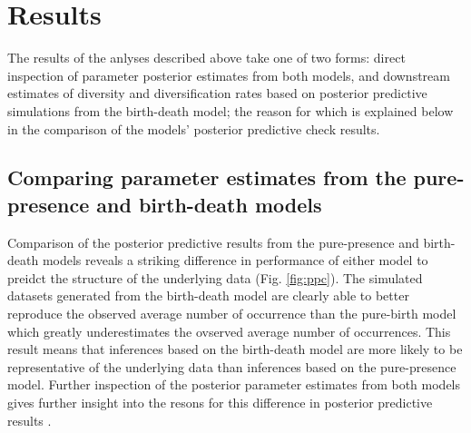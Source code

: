 \documentclass[12pt,letterpaper]{article}
\begin{document}
\section*{Results}

The results of the anlyses described above take one of two forms: direct inspection of parameter posterior estimates from both models, and downstream estimates of diversity and diversification rates based on posterior predictive simulations from the birth-death model; the reason for which is explained below in the comparison of the models' posterior predictive check results.

\subsection*{Comparing parameter estimates from the pure-presence and birth-death models}


Comparison of the posterior predictive results from the pure-presence and birth-death models reveals a striking difference in performance of either model to preidct the structure of the underlying data (Fig. \ref{fig:ppc}). The simulated datasets generated from the birth-death model are clearly able to better reproduce the observed average number of occurrence than the pure-birth model which greatly underestimates the ovserved average number of occurrences. This result means that inferences based on the birth-death model are more likely to be representative of the underlying data than inferences based on the pure-presence model. Further inspection of the posterior parameter estimates from both models gives further insight into the resons for this difference in posterior predictive results \citep{Gelman2013d}. 
\end{document}
